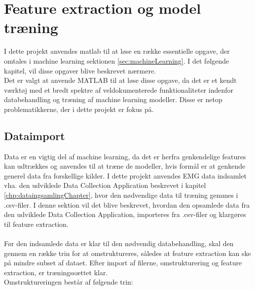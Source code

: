 \thispagestyle{fancy}
\chapter{Feature extraction og model træning}
\label{chp:matlabChapter}
I dette projekt anvendes matlab til at løse en række essentielle opgave, der omtales i machine learning sektionen \ref{sec:machineLearning}. I det følgende kapitel, vil disse opgaver blive beskrevet nærmere. \\
Det er valgt at anvende MATLAB til at løse disse opgave, da det er et kendt værktøj med et bredt spektre af veldokumenterede funktionaliteter indenfor databehandling\citep{matlabFeatures} og træning af machine learning modeller\citep{matlabML}. Disse er netop problematikkerne, der i dette projekt er fokus på. 

\section{Dataimport}
Data er en vigtig del af machine learning, da det er herfra genkendelige features kan udtrækkes og anvendes til at træne de modeller, hvis formål er at genkende generel data fra forskellige kilder. I dette projekt anvendes EMG data indsamlet vha. den udviklede Data Collection Application beskrevet i kapitel \ref{chp:dataingsamlingChapter}, hvor den nødvendige data til træning gemmes i .csv-filer. I denne sektion vil det blive beskrevet, hvordan den opsamlede data fra den udviklede Data Collection Application, importeres fra .csv-filer og klargøres til feature extraction.
\\\\
Før den indsamlede data er klar til den nødvendig databehandling, skal den gennem en række trin for at omstruktureres, således at feature extraction kan ske på mindre subset af dataet. Efter import af filerne, omstrukturering og feature extraction, er træningssættet klar.  
\\ Omstruktureringen består af følgende trin:
